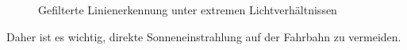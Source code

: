 \documentclass[12pt, a4paper]{scrartcl}
\begin{document}
\begin{figure}[h]
	\caption{Gefilterte Linienerkennung unter extremen Lichtverhältnissen}
	\label{img:line_filt_viel_u_wenig_licht}
\end{figure}

Daher ist es wichtig, direkte Sonneneinstrahlung auf der Fahrbahn zu vermeiden.  

\end{document}
